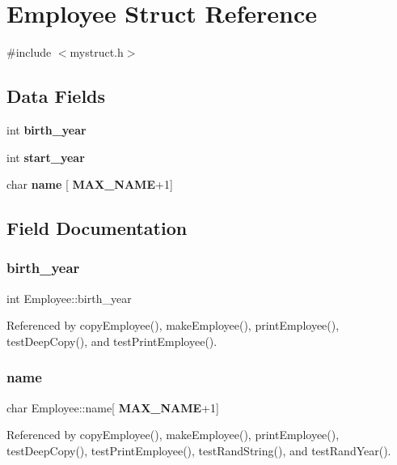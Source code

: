 \section{Employee Struct Reference}
\label{structEmployee}


{\ttfamily \#include $<$mystruct.\+h$>$}

\subsection*{Data Fields}
\begin{DoxyCompactItemize}
\item 
int \textbf{ birth\+\_\+year}
\item 
int \textbf{ start\+\_\+year}
\item 
char \textbf{ name} [\textbf{ M\+A\+X\+\_\+\+N\+A\+ME}+1]
\end{DoxyCompactItemize}


\subsection{Field Documentation}
\mbox{\label{structEmployee_a760204f198562c478aa489b14c7d1d29}} 
\subsubsection{birth\+\_\+year}
{\footnotesize\ttfamily int Employee\+::birth\+\_\+year}



Referenced by copy\+Employee(), make\+Employee(), print\+Employee(), test\+Deep\+Copy(), and test\+Print\+Employee().

\mbox{\label{structEmployee_acd7c4b846e2076017e5fe21ed23ac8dd}} 
\subsubsection{name}
{\footnotesize\ttfamily char Employee\+::name[\textbf{ M\+A\+X\+\_\+\+N\+A\+ME}+1]}



Referenced by copy\+Employee(), make\+Employee(), print\+Employee(), test\+Deep\+Copy(), test\+Print\+Employee(), test\+Rand\+String(), and test\+Rand\+Year().

\mbox{\label{structEmployee_a64042e9bd1a3451ba0349b59f21325a6}} 
